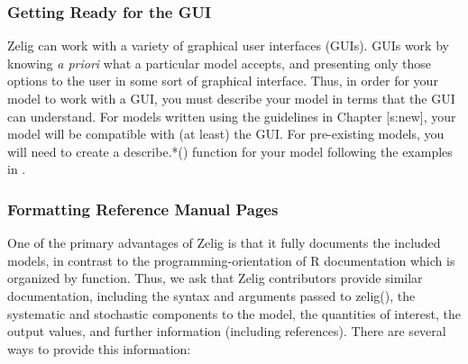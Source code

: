 \documentclass[letterpaper,10pt,english]{sphinxmanual}
\begin{document}
\subsubsection{Getting Ready for the GUI}
\label{docs/dev_guide:getting-ready-for-the-gui}
Zelig can work with a variety of graphical user interfaces (GUIs). GUIs
work by knowing \emph{a priori} what a particular model accepts, and
presenting only those options to the user in some sort of graphical
interface. Thus, in order for your model to work with a GUI, you must
describe your model in terms that the GUI can understand. For models
written using the guidelines in Chapter {[}s:new{]}, your model will be
compatible with (at least) the GUI. For pre-existing models, you will
need to create a describe.*() function for your model following the
examples in .


\subsubsection{Formatting Reference Manual Pages}
\label{docs/dev_guide:formatting-reference-manual-pages}
One of the primary advantages of Zelig is that it fully documents the
included models, in contrast to the programming-orientation of R
documentation which is organized by function. Thus, we ask that Zelig
contributors provide similar documentation, including the syntax and
arguments passed to zelig(), the systematic and stochastic components to
the model, the quantities of interest, the output values, and further
information (including references). There are several ways to provide
this information:
\end{document}
